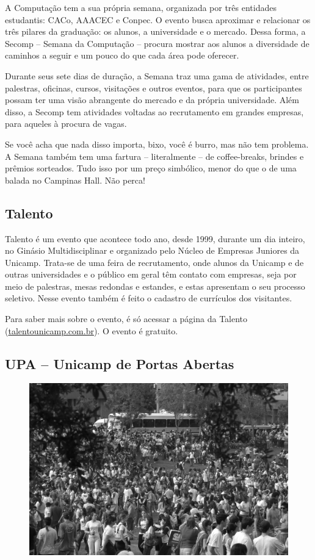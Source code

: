 A Computação tem a sua própria semana, organizada por três entidades estudantis:
CACo, AAACEC e Conpec. O evento busca aproximar e relacionar os três pilares da
graduação: os alunos, a universidade e o mercado. Dessa forma, a Secomp --
Semana da Computação -- procura mostrar aos alunos a diversidade de caminhos a
seguir e um pouco do que cada área pode oferecer.

Durante seus sete dias de duração, a Semana traz uma gama de atividades, entre
palestras, oficinas, cursos, visitações e outros eventos, para que os
participantes possam ter uma visão abrangente do mercado e da própria
universidade. Além disso, a Secomp tem atividades voltadas ao recrutamento em
grandes empresas, para aqueles à procura de vagas.

Se você acha que nada disso importa, bixo, você é burro, mas não tem problema.
A Semana também tem uma fartura -- literalmente -- de coffee-breaks, brindes e
prêmios sorteados. Tudo isso por um preço simbólico, menor do que o de uma
balada no Campinas Hall. Não perca!

\subsection{Talento}

Talento é um evento que acontece todo ano, desde 1999, durante um dia inteiro,
no Ginásio Multidisciplinar e organizado pelo Núcleo de Empresas Juniores da
Unicamp. Trata-se de uma feira de recrutamento, onde alunos da Unicamp e de
outras universidades e o público em geral têm contato com empresas, seja por
meio de palestras, mesas redondas e estandes, e estas apresentam o seu processo
seletivo. Nesse evento também é feito o cadastro de currículos dos visitantes.

Para saber mais sobre o evento, é só acessar a página da Talento
(\url{talentounicamp.com.br}). O evento é gratuito.

\subsection{UPA -- Unicamp de Portas Abertas}

\begin{figure}[h!]
    \centering
    \includegraphics[scale=0.38, keepaspectratio=true]{img/imgs/bateria.jpg}
\end{figure}

